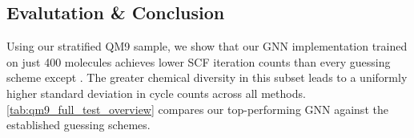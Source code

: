 

\subsection{Evalutation \& Conclusion}
\label{sec:qm9_full_isomers_conclusion}
Using our stratified QM9 sample, we show that our GNN implementation trained on just 400 molecules achieves lower SCF iteration counts than every guessing scheme except . The greater chemical diversity in this subset leads to a uniformly higher standard deviation in cycle counts across all methods. \autoref{tab:qm9_full_test_overview} compares our top-performing GNN against the established guessing schemes.

